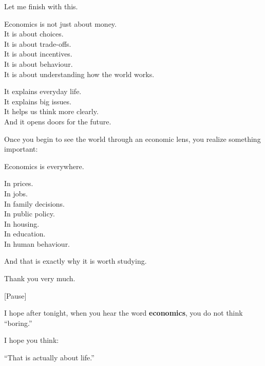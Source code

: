 \documentclass[12pt]{article}
\begin{document}
Let me finish with this.

Economics is not just about money.\\
It is about choices.\\
It is about trade-offs.\\
It is about incentives.\\
It is about behaviour.\\
It is about understanding how the world works.

It explains everyday life.\\
It explains big issues.\\
It helps us think more clearly.\\
And it opens doors for the future.

Once you begin to see the world through an economic lens, you realize something important:

Economics is everywhere.

In prices.\\
In jobs.\\
In family decisions.\\
In public policy.\\
In housing.\\
In education.\\
In human behaviour.

And that is exactly why it is worth studying.

Thank you very much.

[Pause]

I hope after tonight, when you hear the word \textbf{economics}, you do not think “boring.”

I hope you think:

“That is actually about life.”
\end{document}
